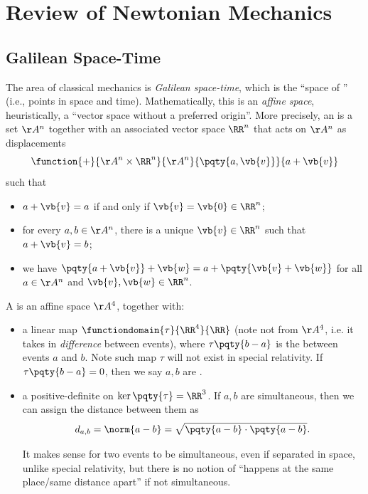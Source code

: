 \section{Review of Newtonian Mechanics}

\subsection{Galilean Space-Time}

The area of classical mechanics is \emph{Galilean space-time}, which is the ``space of '' (i.e., points in space and time). Mathematically, this is an \emph{affine space}, heuristically, a ``vector space without a preferred origin''. More precisely, an  is a set \(\AA^n\) together with an associated vector space \(\RR^n\) that acts on \(\AA^n\) as displacements
\begin{equation}
    \function{+}{\AA^n \times \RR^n}{\AA^n}{\pqty{a, \vb{v}}}{a + \vb{v}}
\end{equation}
such that
\begin{itemize}
    \item \(a + \vb{v} = a\) if and only if \(\vb{v} = \vb{0} \in \RR^n\);
    \item for every \(a, b \in \AA^n\), there is a unique \(\vb{v} \in \RR^n\) such that \(a + \vb{v} = b\);
    \item we have \(\pqty{a + \vb{v}} + \vb{w} = a + \pqty{\vb{v} + \vb{w}}\) for all \(a \in \AA^n\) and \(\vb{v}, \vb{w} \in \RR^n\).
\end{itemize}

A  is an affine space \(\AA^4\), together with:
\begin{itemize}
    \item a linear map \(\functiondomain{\tau}{\RR^4}{\RR}\) (note not from \(\AA^4\), i.e. it takes in \emph{difference} between events), where \(\tau\pqty{b - a}\) is the  between events \(a\) and \(b\). Note such map \(\tau\) will not exist in special relativity. If \(\tau\pqty{b - a} = 0\), then we say \(a, b\) are .
    \item a positive-definite  on \(\ker\pqty{\tau} = \RR^3\). If \(a, b\) are simultaneous, then we can assign the distance between them as
    \begin{equation}
        d_{a, b} = \norm{a - b} = \sqrt{\pqty{a - b} \cdot \pqty{a - b}}.
    \end{equation}

    It makes sense for two events to be simultaneous, even if separated in space, unlike special relativity, but there is no notion of ``happens at the same place/same distance apart'' if not simultaneous.
\end{itemize}

